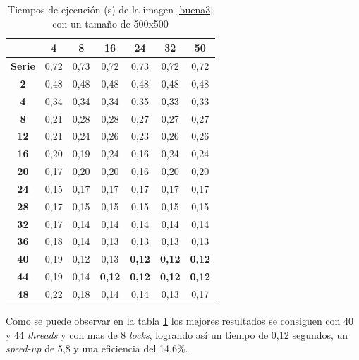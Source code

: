 \begin{table}[H]
	\centering
	\small
	\begin{tabular}{|c|c|c|c|c|c|c|}
		\hline
		{\bf \backslashbox{Threads}{Locks}}   & {\bf 4} & {\bf 8} & {\bf 16} & {\bf 24} & {\bf 32} & {\bf 50} \\ \hline
		{\bf Serie}  & 0,72    & 0,73    & 0,72     & 0,73     & 0,72     & 0,72     \\ \hline
		{\bf 2}  & 0,48    & 0,48    & 0,48     & 0,48     & 0,48     & 0,48     \\ \hline
		{\bf 4}  & 0,34    & 0,34    & 0,34     & 0,35     & 0,33     & 0,33     \\ \hline
		{\bf 8}  & 0,21    & 0,28    & 0,28     & 0,27     & 0,27     & 0,27     \\ \hline
		{\bf 12} & 0,21    & 0,24    & 0,26     & 0,23     & 0,26     & 0,26     \\ \hline
		{\bf 16} & 0,20    & 0,19    & 0,24     & 0,16     & 0,24     & 0,24     \\ \hline
		{\bf 20} & 0,17    & 0,20    & 0,20     & 0,16     & 0,20     & 0,20     \\ \hline
		{\bf 24} & 0,15    & 0,17    & 0,17     & 0,17     & 0,17     & 0,17     \\ \hline
		{\bf 28} & 0,17    & 0,15    & 0,15     & 0,15     & 0,15     & 0,15     \\ \hline
		{\bf 32} & 0,17    & 0,14    & 0,14     & 0,14     & 0,14     & 0,14     \\ \hline
		{\bf 36} & 0,18    & 0,14    & 0,13     & 0,13     & 0,13     & 0,13     \\ \hline
		{\bf 40} & 0,19    & 0,12    & 0,13     & \textbf{0,12 }    & \textbf{0,12}     & \textbf{0,12}     \\ \hline
		{\bf 44} & 0,19    & 0,14    & \textbf{0,12}     & \textbf{0,12}     & \textbf{0,12}     & \textbf{0,12 }    \\ \hline
		{\bf 48} & 0,22    & 0,18    & 0,14     & 0,14     & 0,13     & 0,17     \\ \hline
	\end{tabular}
	\captionsetup{justification=centering}	
	\caption{Tiempos de ejecuci\'{o}n (s) de la imagen \ref{buena3} con un tama\~{n}o de 500x500}
	\label{img3-500}
\end{table}

Como se puede observar en la tabla \ref{img3-500} los mejores resultados se consiguen con 40 y 44 \textit{threads} y con mas de 8 \textit{locks}, logrando as\'{i} un tiempo de 0,12 segundos, un \textit{speed-up} de 5,8 y una eficiencia del 14,6\%. 

